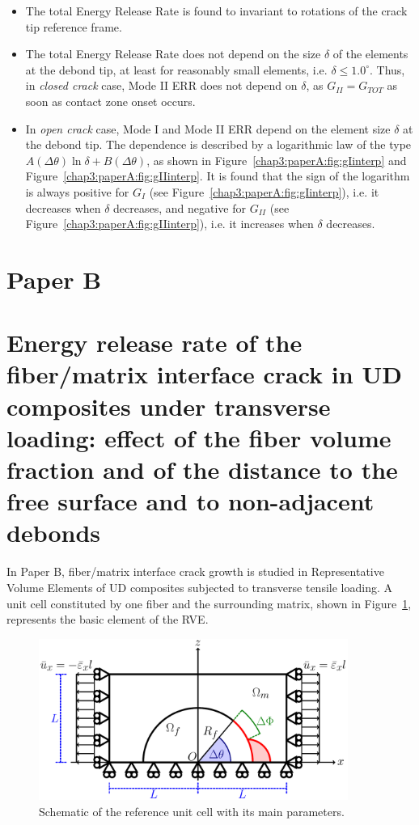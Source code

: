 \begin{itemize}
\item The total Energy Release Rate is found to invariant to rotations of the crack tip reference frame.
\item The total Energy Release Rate does not depend on the size $\delta$ of the elements at the debond tip, at least for reasonably small elements, i.e. $\delta\leq1.0^{\circ}$. Thus, in \emph{closed crack} case, Mode II ERR does not depend on $\delta$, as $G_{II}=G_{TOT}$ as soon as contact zone onset occurs.
\item In \emph{open crack} case, Mode I and Mode II ERR depend on the element size $\delta$ at the debond tip. The dependence is described by a logarithmic law of the type $A\left(\Delta\theta\right)\ln\delta+B\left(\Delta\theta\right)$, as shown in Figure~\ref{chap3:paperA:fig:gIinterp} and Figure~\ref{chap3:paperA:fig:gIIinterp}. It is found that the sign of the logarithm is always positive for $G_{I}$ (see Figure~\ref{chap3:paperA:fig:gIinterp}), i.e. it decreases when $\delta$ decreases, and negative for $G_{II}$ (see Figure~\ref{chap3:paperA:fig:gIIinterp}), i.e. it increases when $\delta$ decreases.
\end{itemize}


\section{Paper B}\label{chap3:paperB}
\section*{Energy release rate of the fiber/matrix interface crack in UD composites under transverse loading: effect of the fiber volume fraction and of the distance to the free surface and to non-adjacent debonds}

In Paper B, fiber/matrix interface crack growth is studied in Representative Volume Elements of UD composites subjected to transverse tensile loading. A unit cell constituted by one fiber and the surrounding matrix, shown in Figure~\ref{chap3:paperB:fig:modelschem}, represents the basic element of the RVE.

\begin{figure}[!h]
    \includegraphics[width=0.9\textwidth]{paperB/RUC.pdf}
    \caption{Schematic of the reference unit cell with its main parameters.}\label{chap3:paperB:fig:modelschem}
\end{figure}

